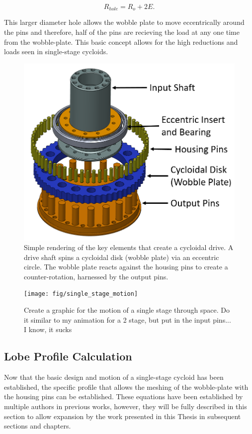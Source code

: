 \begin{equation} \label{eq:pin_hole_diam}
R_{hole} = R_o + 2E.
\end{equation}

This larger diameter hole allows the wobble plate to move eccentrically around the pins and therefore, half of the pins are recieving the load at any one time from the wobble-plate. This basic concept allows for the high reductions and loads seen in single-stage cycloids.

\begin{figure}[!b]
   \centering
   \includegraphics[width=0.60\linewidth]{fig/cycloid_cartoon_v2}
   \caption{Simple rendering of the key elements that create a cycloidal drive.
   A drive shaft spins a cycloidal disk (wobble plate) via an eccentric circle.
   The wobble plate reacts against the housing pins to create a counter-rotation, harnessed by the output pins.}
   \label{fig:single_cartoon}
\end{figure}

\begin{figure}[!b]
   \centering
   \texttt{[image: fig/single\_stage\_motion]}
   \caption{Create a graphic for the motion of a single stage through space. Do it similar to my animation for a 2 stage, but put in the input pins... I know, it sucks}
   \label{fig:singe_movement_cartoon}
\end{figure}

\subsection{Lobe Profile Calculation} \label{ch:design:basic_calc:profile}

Now that the basic design and motion of a single-stage cycloid has been established, the specific profile that allows the meshing of the wobble-plate with the housing pins can be established. These equations have been established by multiple authors in previous works, however, they will be fully described in this section to allow expansion by the work presented in this Thesis in subsequent sections and chapters. 

